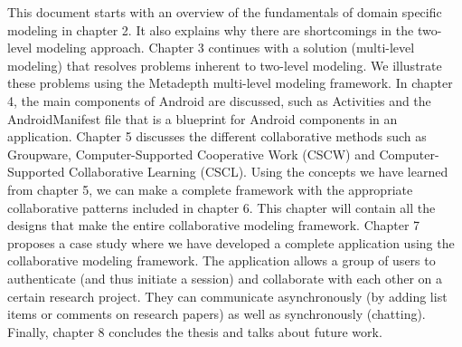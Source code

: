 This document starts with an overview of the fundamentals of domain specific modeling in chapter 2. It also explains why there are shortcomings in the two-level modeling approach. Chapter 3 continues with a solution (multi-level modeling) that resolves problems inherent to two-level modeling. We illustrate these problems using the Metadepth multi-level modeling framework. In chapter 4, the main components of Android are discussed, such as Activities and the AndroidManifest file that is a blueprint for Android components in an application. Chapter 5 discusses the different collaborative methods such as Groupware, Computer-Supported Cooperative Work (CSCW) and Computer-Supported Collaborative Learning (CSCL). Using the concepts we have learned from chapter 5, we can make a complete framework with the appropriate collaborative patterns included in chapter 6. This chapter will contain all the designs that make the entire collaborative modeling framework. Chapter 7 proposes a case study where we have developed a complete application using the collaborative modeling framework. The application allows a group of users to authenticate (and thus initiate a session) and collaborate with each other on a certain research project. They can communicate asynchronously (by adding list items or comments on research papers) as well as synchronously (chatting). Finally, chapter 8 concludes the thesis and talks about future work.
